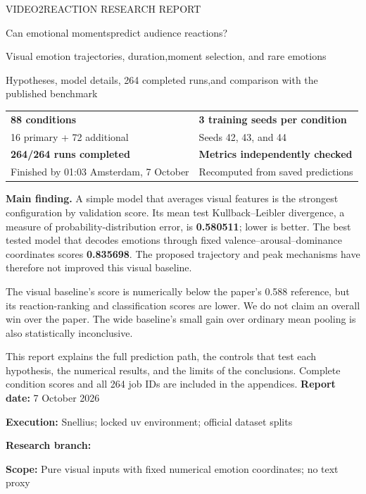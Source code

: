 \documentclass[11pt,a4paper]{article}
\newcommand{\keypoint}[1]{\par\smallskip\colorbox{soft}{\parbox{0.95\linewidth}{#1}}\par\smallskip}
\begin{document}
\hypersetup{pageanchor=false}
\begin{titlepage}
\vspace*{7mm}
{\large\textcolor{accent}{VIDEO2REACTION RESEARCH REPORT}}\par
\vspace{8mm}
{\fontsize{28}{33}\selectfont\bfseries\raggedright\textcolor{ink}{Can emotional moments\newline predict audience reactions?}\par}
\vspace{5mm}
{\Large Visual emotion trajectories, duration,\newline moment selection, and rare emotions}\par
\vspace{7mm}
{\large Hypotheses, model details, 264 completed runs,\newline and comparison with the published benchmark}\par
\vspace{9mm}
\begin{tabularx}{\linewidth}{@{}XX@{}}
\textbf{88 conditions} & \textbf{3 training seeds per condition}\\
16 primary + 72 additional & Seeds 42, 43, and 44\\[5pt]
\textbf{264/264 runs completed} & \textbf{Metrics independently checked}\\
Finished by 01:03 Amsterdam, 7 October & Recomputed from saved predictions\\
\end{tabularx}
\vspace{9mm}
\keypoint{\textbf{Main finding.} A simple model that averages visual features is the strongest configuration by validation score. Its mean test Kullback--Leibler divergence, a measure of probability-distribution error, is \textbf{0.580511}; lower is better. The best tested model that decodes emotions through fixed valence--arousal--dominance coordinates scores \textbf{0.835698}. The proposed trajectory and peak mechanisms have therefore not improved this visual baseline.}
\vspace{4mm}
The visual baseline's score is numerically below the paper's 0.588 reference, but its reaction-ranking and classification scores are lower. We do not claim an overall win over the paper. The wide baseline's small gain over ordinary mean pooling is also statistically inconclusive.

This report explains the full prediction path, the controls that test each hypothesis, the numerical results, and the limits of the conclusions. Complete condition scores and all 264 job IDs are included in the appendices.
\vfill
\textbf{Report date:} 7 October 2026\par
\textbf{Execution:} Snellius; locked uv environment; official dataset splits\par
\textbf{Research branch:} \par
\textbf{Scope:} Pure visual inputs with fixed numerical emotion coordinates; no text proxy\par
\end{titlepage}
\end{document}
